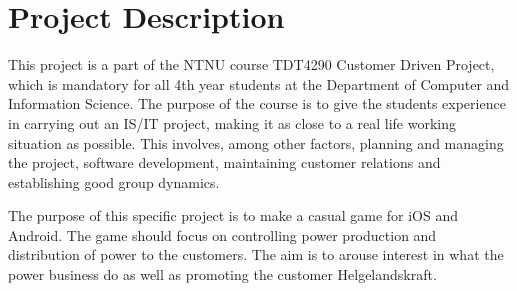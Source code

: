 \section{Project Description}

This project is a part of the NTNU course TDT4290 Customer Driven Project, which is mandatory for all 4th year students at the Department of Computer and Information Science. The purpose of the course is to give the students experience in carrying out an IS/IT project, making it as close to a real life working situation as possible. This involves, among other factors, planning and managing the project, software development, maintaining customer relations and establishing good group dynamics.


The purpose of this specific project is to make a casual game for iOS and Android. The game should focus on controlling power production and distribution of power to the customers. The aim is to arouse interest in what the power business do as well as promoting the customer Helgelandskraft.
